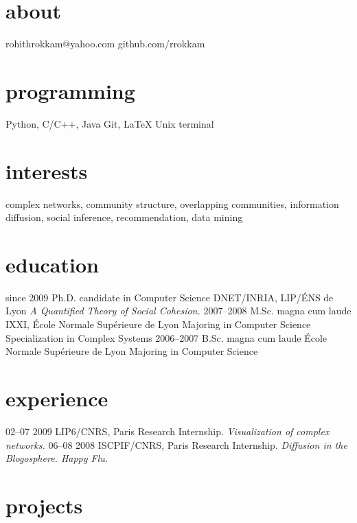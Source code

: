 \documentclass{cv}
\begin{document}

\begin{aside}
  \section{about}
    rohithrokkam@yahoo.com
    github.com/rrokkam
  \section{programming}
    Python, C/C++, Java
    Git, \LaTeX
    Unix terminal
\end{aside}

\section{interests}

complex networks, community structure, overlapping communities, information
diffusion, social inference, recommendation, data mining

\section{education}

\begin{entrylist}
  \entry
    {since 2009}
    {Ph.D. {\normalfont candidate in Computer Science}}
    {DNET/INRIA, LIP/ÉNS de Lyon}
    {\emph{A Quantified Theory of Social Cohesion.}}
  \entry
    {2007–2008}
    {M.Sc. magna cum laude}
    {IXXI, École Normale Supérieure de Lyon}
    {Majoring in Computer Science\\
    Specialization in Complex Systems}
  \entry
    {2006–2007}
    {B.Sc. magna cum laude}
    {École Normale Supérieure de Lyon}
    {Majoring in Computer Science}
\end{entrylist}

\section{experience}

\begin{entrylist}
  \entry
    {02–07 2009}
    {LIP6/CNRS, Paris}
    {Research Internship.}
    {\emph{Visualization of complex networks.}}
  \entry
    {06–08 2008}
    {ISCPIF/CNRS, Paris}
    {Research Internship.}
    {\emph{Diffusion in the Blogosphere. Happy Flu.}}
\end{entrylist}

\section{projects}
\end{document}
